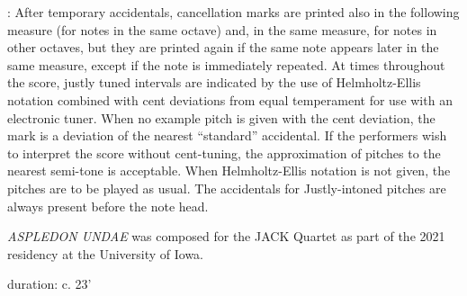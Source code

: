 \documentclass[11pt]{article}
\begin{document}
\begin{center}
 : After temporary accidentals, cancellation marks are printed also in the following measure (for notes in the same octave) and, in the same measure, for notes in other octaves, but they are printed again if the same note appears later in the same measure, except if the note is immediately repeated. At times throughout the score, justly tuned intervals are indicated by the use of Helmholtz-Ellis notation combined with cent deviations from equal temperament for use with an electronic tuner. When no example pitch is given with the cent deviation, the mark is a deviation of the nearest ``standard'' accidental. If the performers wish to interpret the score without cent-tuning, the approximation of pitches to the nearest semi-tone is acceptable. When Helmholtz-Ellis notation is not given, the pitches are to be played as usual. The accidentals for Justly-intoned pitches are always present before the note head.
\rightskip\leftskip
\phantom{text} \hfill \phantom{()}
\end{center}
\endgroup

\vspace*{1\baselineskip}

\begin{center}
\textit{ASPLEDON UNDAE} was composed for the JACK Quartet as part of the 2021 residency at the University of Iowa.
\end{center}

\vspace*{1\baselineskip}

\begin{center}
duration: c. 23'
\end{center}
\end{document}
